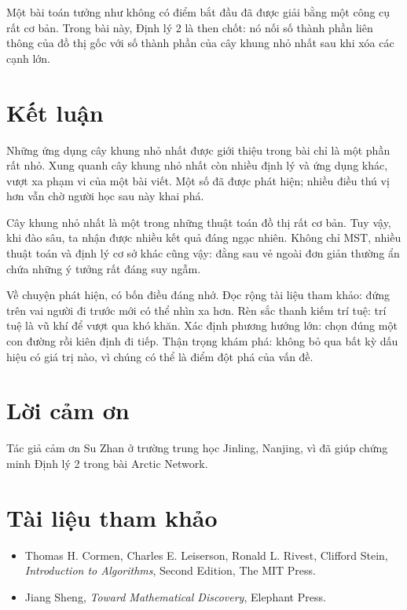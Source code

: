 \documentclass[11pt]{article}
\begin{document}
Một bài toán tưởng như không có điểm bắt đầu đã được giải bằng một công cụ rất
cơ bản. Trong bài này, Định lý 2 là then chốt: nó nối số thành phần liên thông
của đồ thị gốc với số thành phần của cây khung nhỏ nhất sau khi xóa các cạnh
lớn.

\section{Kết luận}

Những ứng dụng cây khung nhỏ nhất được giới thiệu trong bài chỉ là một phần
rất nhỏ. Xung quanh cây khung nhỏ nhất còn nhiều định lý và ứng dụng khác,
vượt xa phạm vi của một bài viết. Một số đã được phát hiện; nhiều điều thú vị
hơn vẫn chờ người học sau này khai phá.

Cây khung nhỏ nhất là một trong những thuật toán đồ thị rất cơ bản. Tuy vậy,
khi đào sâu, ta nhận được nhiều kết quả đáng ngạc nhiên. Không chỉ MST, nhiều
thuật toán và định lý cơ sở khác cũng vậy: đằng sau vẻ ngoài đơn giản thường
ẩn chứa những ý tưởng rất đáng suy ngẫm.

Về chuyện phát hiện, có bốn điều đáng nhớ. Đọc rộng tài liệu tham khảo: đứng
trên vai người đi trước mới có thể nhìn xa hơn. Rèn sắc thanh kiếm trí tuệ:
trí tuệ là vũ khí để vượt qua khó khăn. Xác định phương hướng lớn: chọn đúng
một con đường rồi kiên định đi tiếp. Thận trọng khám phá: không bỏ qua bất kỳ
dấu hiệu có giá trị nào, vì chúng có thể là điểm đột phá của vấn đề.

\section*{Lời cảm ơn}

Tác giả cảm ơn Su Zhan ở trường trung học Jinling, Nanjing, vì đã giúp chứng
minh Định lý 2 trong bài Arctic Network.

\section*{Tài liệu tham khảo}

\begin{itemize}
  \item Thomas H. Cormen, Charles E. Leiserson, Ronald L. Rivest, Clifford
  Stein, \textit{Introduction to Algorithms}, Second Edition, The MIT Press.
  \item Jiang Sheng, \textit{Toward Mathematical Discovery}, Elephant Press.
\end{itemize}
\end{document}
